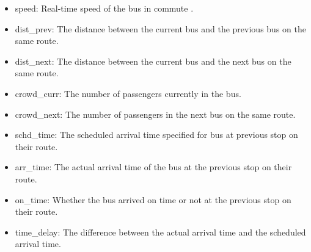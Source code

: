 \documentclass[
]{article}
\providecommand{\tightlist}{%
  \setlength{\itemsep}{0pt}\setlength{\parskip}{0pt}}
\begin{document}
\begin{itemize}
\tightlist
\item
  speed: Real-time speed of the bus in commute .
\item
  dist\_prev: The distance between the current bus and the previous bus
  on the same route.
\item
  dist\_next: The distance between the current bus and the next bus on
  the same route.
\item
  crowd\_curr: The number of passengers currently in the bus.
\item
  crowd\_next: The number of passengers in the next bus on the same
  route.
\item
  schd\_time: The scheduled arrival time specified for bus at previous
  stop on their route.
\item
  arr\_time: The actual arrival time of the bus at the previous stop on
  their route.
\item
  on\_time: Whether the bus arrived on time or not at the previous stop
  on their route.
\item
  time\_delay: The difference between the actual arrival time and the
  scheduled arrival time.
\end{itemize}
\end{document}
